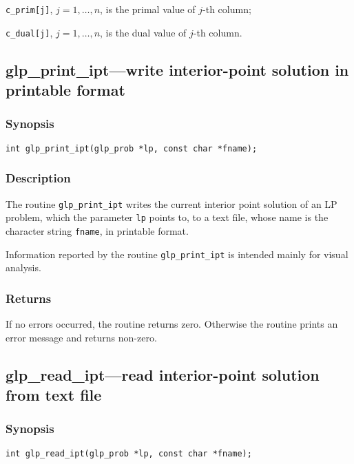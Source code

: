 \noindent
\verb|c_prim[j]|, $j=1,\dots,n$, is the primal value of $j$-th column;

\noindent
\verb|c_dual[j]|, $j=1,\dots,n$, is the dual value of $j$-th column.

\subsection{glp\_print\_ipt---write interior-point solution in
printable format}

\subsubsection*{Synopsis}

\begin{verbatim}
int glp_print_ipt(glp_prob *lp, const char *fname);
\end{verbatim}

\subsubsection*{Description}

The routine \verb|glp_print_ipt| writes the current interior point
solution  of an LP problem, which the parameter \verb|lp| points to, to
a text file, whose name is the character string \verb|fname|, in
printable format.

Information reported by the routine \verb|glp_print_ipt| is intended
mainly for visual analysis.

\subsubsection*{Returns}

If no errors occurred, the routine returns zero. Otherwise the routine
prints an error message and returns non-zero.

\subsection{glp\_read\_ipt---read interior-point solution from text
file}

\subsubsection*{Synopsis}

\begin{verbatim}
int glp_read_ipt(glp_prob *lp, const char *fname);
\end{verbatim}

